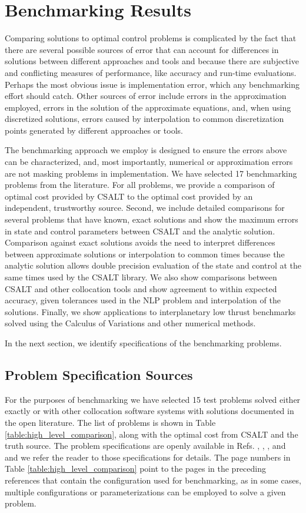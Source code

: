 \documentclass[ISTS  ]{tjsass} %
\begin{document}
\section{Benchmarking Results}

Comparing solutions to optimal control problems is complicated by the fact that there are several possible sources of error that can account for differences in solutions between different approaches and tools and because there are subjective and conflicting measures of performance, like accuracy and run-time evaluations.   Perhaps the most obvious issue is implementation error, which any benchmarking effort should catch.   Other sources of error include errors in the approximation employed, errors in the solution of the approximate equations, and, when using discretized solutions, errors caused by interpolation to common discretization points generated by different approaches or tools.

The benchmarking approach we employ is designed to ensure the errors above can be characterized, and, most importantly, numerical or approximation errors are not masking problems in implementation.  We have selected 17 benchmarking problems from the literature.  For all problems, we provide a comparison of optimal cost provided by CSALT to the optimal cost provided by an independent, trustworthy source.  Second, we include detailed comparisons for several problems that have known, exact solutions and show the maximum errors in state and control parameters between CSALT and the analytic solution. Comparison against exact solutions avoids the need to interpret differences between approximate solutions or interpolation to common times because the analytic solution allows double precision evaluation of the state and control at the same times used by the CSALT library.   We also show comparisons between CSALT and other collocation tools and show agreement to within expected accuracy, given tolerances used in the NLP problem and interpolation of the solutions.  Finally, we show applications to interplanetary low thrust benchmarks solved using the Calculus of Variations and other numerical methods.

In the next section, we identify specifications of the benchmarking problems.

\subsection{Problem Specification Sources}

For the purposes of benchmarking we have selected 15 test problems solved either exactly or with other collocation software systems with solutions documented in the open literature.  The list of problems is shown in Table \ref{table:high_level_comparison}, along with the optimal cost from CSALT and the truth source.   The problem specifications are openly available in Refs. , , , and  and we refer the reader to those specifications for details.  The page numbers in Table \ref{table:high_level_comparison} point to the pages in the preceding references that contain the configuration used for benchmarking, as in some cases, multiple configurations or parameterizations can be employed to solve a given problem.
\end{document}
